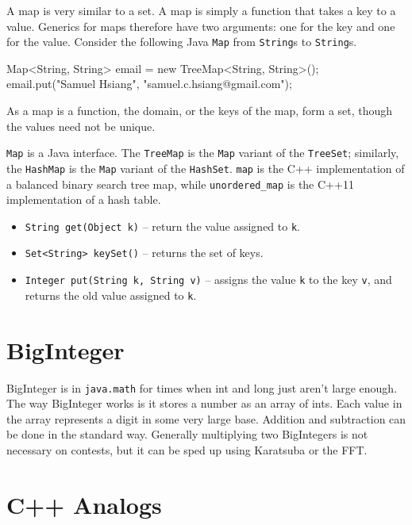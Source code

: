 A map is very similar to a set. A map is simply a function that takes a key to a value. Generics for maps therefore have two arguments: one for the key and one for the value. Consider the following Java \texttt{Map} from \texttt{String}s to \texttt{String}s.

\begin{mylstlisting}
Map<String, String> email = new TreeMap<String, String>();
email.put("Samuel Hsiang", "samuel.c.hsiang@gmail.com");
\end{mylstlisting}

As a map is a function, the domain, or the keys of the map, form a set, though the values need not be unique.

\texttt{Map} is a Java interface. The \texttt{TreeMap} is the \texttt{Map} variant of the \texttt{TreeSet}; similarly, the \texttt{HashMap} is the \texttt{Map} variant of the \texttt{HashSet}. \texttt{map} is the C++ implementation of a balanced binary search tree map, while \texttt{unordered\_map} is the C++11 implementation of a hash table.

\begin{itemize}

\item
\texttt{String get(Object k)} -- return the value assigned to \texttt{k}.

\item
\texttt{Set<String> keySet()} -- returns the set of keys.

\item
\texttt{Integer put(String k, String v)} -- assigns the value \texttt{k} to the key \texttt{v}, and returns the old value assigned to \texttt{k}.

\end{itemize}

\section{BigInteger}

BigInteger is in \texttt{java.math} for times when int and long just aren't large enough. The way BigInteger works is it stores a number as an array of ints. Each value in the array represents a digit in some very large base. Addition and subtraction can be done in the standard way. Generally multiplying two BigIntegers is not necessary on contests, but it can be sped up using Karatsuba or the FFT.

\section{C++ Analogs}


